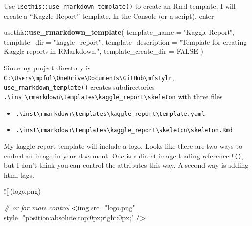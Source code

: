 \documentclass[
]{book}
\newenvironment{Shaded}{\begin{snugshade}}{\end{snugshade}}
\newcommand{\CommentTok}[1]{\textcolor[rgb]{0.56,0.35,0.01}{\textit{#1}}}
\newcommand{\DataTypeTok}[1]{\textcolor[rgb]{0.13,0.29,0.53}{#1}}
\newcommand{\ErrorTok}[1]{\textcolor[rgb]{0.64,0.00,0.00}{\textbf{#1}}}
\newcommand{\KeywordTok}[1]{\textcolor[rgb]{0.13,0.29,0.53}{\textbf{#1}}}
\newcommand{\NormalTok}[1]{#1}
\newcommand{\OperatorTok}[1]{\textcolor[rgb]{0.81,0.36,0.00}{\textbf{#1}}}
\newcommand{\OtherTok}[1]{\textcolor[rgb]{0.56,0.35,0.01}{#1}}
\newcommand{\StringTok}[1]{\textcolor[rgb]{0.31,0.60,0.02}{#1}}
\providecommand{\tightlist}{%
  \setlength{\itemsep}{0pt}\setlength{\parskip}{0pt}}
\begin{document}
Use \texttt{usethis::use\_rmarkdown\_template()} to create an Rmd template. I will create a ``Kaggle Report'' template. In the Console (or a script), enter

\begin{Shaded}
\begin{Highlighting}[]
\NormalTok{usethis}\OperatorTok{::}\KeywordTok{use_rmarkdown_template}\NormalTok{(}
  \DataTypeTok{template_name =} \StringTok{"Kaggle Report"}\NormalTok{,}
  \DataTypeTok{template_dir =} \StringTok{"kaggle_report"}\NormalTok{,}
  \DataTypeTok{template_description =} \StringTok{"Template for creating Kaggle reports in RMarkdown."}\NormalTok{,}
  \DataTypeTok{template_create_dir =} \OtherTok{FALSE}
\NormalTok{)}
\end{Highlighting}
\end{Shaded}

Since my project directory is \texttt{C:\textbackslash{}Users\textbackslash{}mpfol\textbackslash{}OneDrive\textbackslash{}Documents\textbackslash{}GitHub\textbackslash{}mfstylr}, \texttt{use\_rmarkdown\_template()} creates subdirectories \texttt{.\textbackslash{}inst\textbackslash{}rmarkdown\textbackslash{}templates\textbackslash{}kaggle\_report\textbackslash{}skeleton} with three files

\begin{itemize}
\tightlist
\item
  \texttt{.\textbackslash{}inst\textbackslash{}rmarkdown\textbackslash{}templates\textbackslash{}kaggle\_report\textbackslash{}template.yaml}
\item
  \texttt{.\textbackslash{}inst\textbackslash{}rmarkdown\textbackslash{}templates\textbackslash{}kaggle\_report\textbackslash{}skeleton\textbackslash{}skeleton.Rmd}
\end{itemize}

My kaggle report template will include a logo. Looks like there are two ways to embed an image in your document. One is a direct image loading reference \texttt{!()}, but I don't think you can control the attributes this way. A second way is adding html tags.

\begin{Shaded}
\begin{Highlighting}[]
\OperatorTok{!}\NormalTok{[](logo.png)}

\CommentTok{# or for more control}
\OperatorTok{<}\NormalTok{img src=}\StringTok{"logo.png"}\NormalTok{ style=}\StringTok{"position:absolute;top:0px;right:0px;"} \OperatorTok{/}\ErrorTok{>}
\end{Highlighting}
\end{Shaded}

  
\end{document}
